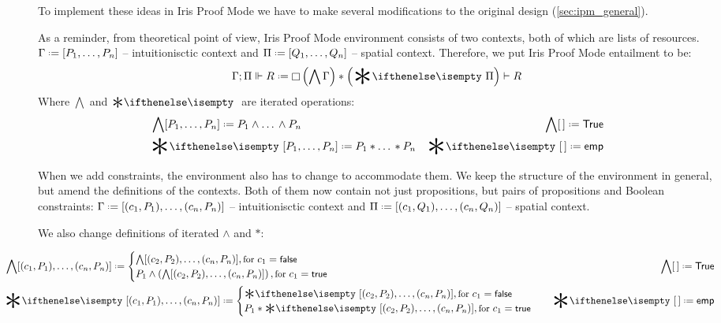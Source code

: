 {To implement these ideas in Iris Proof Mode we have to make several modifications to the original design (\ref{sec:ipm_general}).

As a reminder, from theoretical point of view, Iris Proof Mode environment consists of two contexts, both of which are lists of resources.
\(\IntuD \defeq [\dd P n]\) -- intuitionisctic context and \(\SpatD \defeq [\dd Q n]\) -- spatial context.
Therefore, we put Iris Proof Mode entailment to be: \[\entailsD R \defeq \intuit \left(\bigwedge \IntuD\right) * \left(\Sep \SpatD\right) \vdash R\]
Where \(\bigwedge\) and \(\Sep\) are iterated operations:
\begin{align*}
  & \bigwedge  [\dd P n] \defeq P_1 \wedge \dots\, \wedge P_n
  & \bigwedge [\,] \defeq \True \\
  & \Sep {[\dd P n]} \defeq P_1 * \dots\, * P_n
  & \Sep {[\,]} \defeq \emp
\end{align*}

When we add constraints, the environment also has to change to accommodate them.
We keep the structure of the environment in general, but amend the definitions of the contexts.
Both of them now contain not just propositions, but pairs of propositions and Boolean constraints:
\(\IntuD \defeq [(c_1,P_1),\dots,(c_n,P_n)]\) -- intuitionisctic context and \(\SpatD \defeq [(c_1,Q_1),\dots,(c_n,Q_n)]\) -- spatial context.

We also change definitions of iterated \(\wedge\) and \(*\):\\
\begin{minipage}[t]{1.1\linewidth}
  \begin{align*}
    & \hspace{-0.1\linewidth}
      \bigwedge  [(c_1, P_1), \dots, (c_n, P_n)] \defeq
      \begin{cases}
        \bigwedge [(c_2, P_2), \dots, (c_n, P_n)],
          {\small \text{for } c_1 = \false}\\
        P_1 \wedge \left( \bigwedge [(c_2, P_2), \dots, (c_n, P_n)] \right),
          {\small \text{for } c_1 = \true }
      \end{cases}
    & \bigwedge [\,] \defeq \True \\
    & \hspace{-0.1\linewidth}
      \Sep {[(c_1, P_1), \dots, (c_n, P_n)]} \defeq
      \begin{cases}
        \Sep {[(c_2, P_2), \dots, (c_n, P_n)]},
          {\small \text{for } c_1 = \false} \\
        P_1 * \Sep {[(c_2, P_2), \dots, (c_n, P_n)]},
          {\small \text{for } c_1 = \true}
      \end{cases}
    & \Sep {[\,]} \defeq \emp
  \end{align*}
\end{minipage}

}
